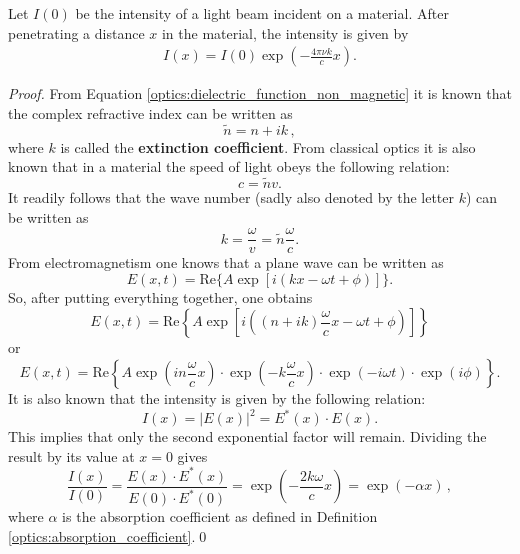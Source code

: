     \begin{theorem}\label{optics:lambert_beer}
        Let $I(0)$ be the intensity of a light beam incident on a material. After penetrating a distance $x$ in the material, the intensity is given by
        \begin{gather}
            I(x) = I(0)\exp\left(-\frac{4\pi\nu k}{c}x\right).
        \end{gather}
        \begin{mdframed}[roundcorner=10pt, linecolor=blue, linewidth=1pt]
            \begin{proof}
                From Equation \eqref{optics:dielectric_function_non_magnetic} it is known that the complex refractive index can be written as \[\widetilde{n} = n+ik\,,\] where $k$ is called the \textbf{extinction coefficient}. From classical optics it is also known that in a material the speed of light obeys the following relation: \[c = \widetilde{n}v.\] It readily follows that the wave number (sadly also denoted by the letter $k$) can be written as \[k = \frac{\omega}{v} = \widetilde{n}\frac{\omega}{c}.\] From electromagnetism one knows that a plane wave can be written as \[E(x,t) = \mathrm{Re}\big\{A\exp\left[i(kx - \omega t + \phi)\right]\big\}.\] So, after putting everything together, one obtains \[E(x,t) = \mathrm{Re}\left\{A\exp\left[i\left((n+ik)\frac{\omega}{c}x - \omega t + \phi\right)\right]\right\}\] or \[E(x,t) = \mathrm{Re}\left\{A\exp\left(in\frac{\omega}{c}x\right)\cdot\exp\left(-k\frac{\omega}{c}x\right)\cdot\exp\left(-i\omega t\right)\cdot\exp\left(i\phi\right)\right\}.\] It is also known that the intensity is given by the following relation:\[I(x) = |E(x)|^2 = E^*(x)\cdot E(x).\] This implies that only the second exponential factor will remain. Dividing the result by its value at $x=0$ gives \[\frac{I(x)}{I(0)} = \frac{E(x)\cdot E^*(x)}{E(0)\cdot E^*(0)} = \exp\left(-\frac{2k\omega}{c}x\right) = \exp(-\alpha x)\,,\]
                where $\alpha$ is the absorption coefficient as defined in Definition \ref{optics:absorption_coefficient}.\qed
            \end{proof}
        \end{mdframed}
    \end{theorem}


